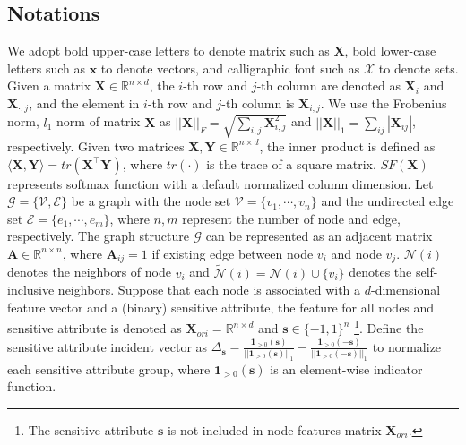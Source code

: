 \documentclass[letterpaper]{article} %
\theoremstyle{plain}
\theoremstyle{definition}
\theoremstyle{remark}
\begin{document}
\subsection{Notations}
We adopt bold upper-case letters to denote matrix such as $\mathbf{X}$, bold lower-case letters such as $\mathbf{x}$ to denote vectors, and calligraphic font such as $\mathcal{X}$ to denote sets. Given a matrix $\mathbf{X}\in\mathbb{R}^{n\times d}$, the $i$-th row and $j$-th column are denoted as $\mathbf{X}_i$ and $\mathbf{X}_{\cdot,j}$, and the element in $i$-th row and $j$-th column is 
$\mathbf{X}_{i,j}$. We use the Frobenius norm, $l_1$ norm of matrix $\mathbf{X}$ as $||\mathbf{X}||_F=\sqrt{\sum_{i,j}\mathbf{X}_{i,j}^2}$ and $||\mathbf{X}||_1=\sum_{ij}|\mathbf{X}_{ij}|$, respectively. Given two matrices $\mathbf{X}, \mathbf{Y}\in\mathbb{R}^{n \times d}$, the inner product is defined as $\langle\mathbf{X}, \mathbf{Y}\rangle=tr(\mathbf{X}^{\top}\mathbf{Y})$, where $tr(\cdot)$ is the trace of a square matrix. $SF(\mathbf{X})$ represents softmax function with a default normalized column dimension. Let $\mathcal{G}=\{\mathcal{V}, \mathcal{E}\}$ be a graph with the node set $\mathcal{V}=\{v_1, \cdots, v_n\}$ and the undirected edge set $\mathcal{E}=\{e_1, \cdots, e_m\}$, where $n, m$ represent the number of node and edge, respectively. The graph structure $\mathcal{G}$ can be represented as an adjacent matrix $\mathbf{A}\in\mathbb{R}^{n\times n}$, where $\mathbf{A}_{ij}=1$ if existing edge between node $v_i$ and node $v_j$. $\mathcal{N}(i)$ denotes the neighbors
of node $v_i$ and $\tilde{\mathcal{N}}(i)=\mathcal{N}(i)\cup \{v_i\}$ denotes the self-inclusive neighbors.
Suppose that each node is associated with a $d$-dimensional feature vector and a (binary) sensitive attribute, the feature for all nodes and sensitive attribute is denoted as $\mathbf{X}_{ori}=\mathbb{R}^{n\times d}$ and $\mathbf{s}\in \{-1, 1\}^{n}$ \footnote{The sensitive attribute $\mathbf{s}$ is not included in node features matrix $\mathbf{X}_{ori}$.}. Define the sensitive attribute incident vector as $\Delta_{\mathbf{s}}= \frac{\bm{1}_{>0}(\mathbf{s})}{||\bm{1}_{>0}(\mathbf{s})||_1} - \frac{\bm{1}_{>0}(-\mathbf{s})}{||\bm{1}_{>0}(-\mathbf{s})||_1}$ to normalize each sensitive attribute group, where $\bm{1}_{>0}(\mathbf{s})$ is an element-wise indicator function.
\end{document}

